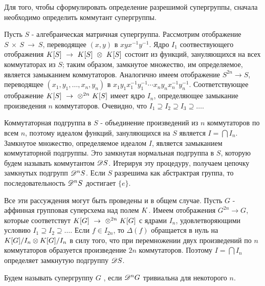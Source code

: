 Для того, чтобы сформулировать определение разрешимой супергруппы,
сначала необходимо определить коммутант супергруппы.

Пусть $ S $ - алгебраическая матричная супергруппа. Рассмотрим отображение
$ S ~\times ~S ~\to ~S $, переводящее $ (x, y) $ в $ xyx^{-1}y^{-1} $.
Ядро $ I_{1} $ соотвествующего отображения $ K[S] ~\to ~K[S] ~\otimes ~K[S] $ состоит из функций, зануляющихся на всех коммутаторах из $ S $;
таким образом, замкнутое множество, им определяемое, является замыканием коммутаторов. Аналогично имеем отображение $ S^{2n} \to S $, 
переводящее $ (x_1, y_1, \ldots, x_n, y_n) $ в 
$ x_1y_1x_1^{-1}y_1^{-1} \cdots x_ny_nx_n^{-1}y_n^{-1} $.
Соответствующее отображение $ K[S] ~\to ~\otimes^{2n} ~K[S] $ имеет ядро
$ I_n $, определяющее замыкание произведения $ n $ коммутаторов. 
Очевидно, что $ I_1 \supseteq I_2 \supseteq I_3 \supseteq \ldots $.

Коммутаторная подгруппа в $ S $ - объединение произведений из $ n $ 
коммутаторов по всем $ n $, поэтому идеалом функций, зануляющихся на $ S $ является $ I = \bigcap I_n $. Замкнутое множество, определяемое идеалом $ I $,
является замыканием коммутаторной подгруппы. Это замкнутая нормальная подгруппа в 
$ S $, которую будем называть коммутантом $ \mathscr{D} S $.
Итерируя эту процедуру, получаем цепочку замкнутых подгрупп $ \mathscr{D}^{n} S $. Если $ S $ разрешима как абстрактрая группа, 
то последовательность $ \mathscr{D}^{n} S $ достигает $ \{e\} $.


Все эти рассуждения могут быть проведены и в общем случае. Пусть $ G $ - аффинная групповая суперсхема над полем $ K $. Имеем отображения $ G^{2n} \to G $, которые соответствут $ K[G] ~\to ~\otimes^{2n} ~K[G] $ с ядрами $ I_n $, удовлетворяющими условию $ I_1 \supseteq I_2 \supseteq \ldots $. Если $ f \in I_{2n} $,
то $ \Delta(f) $ обращается в нуль на $ K[G] / I_n \otimes K[G] / I_n $ в силу того, что при перемножении двух произведений по $ n $ коммутаторов образуется произведение $ 2n $ коммутаторов. Поэтому $ I = \bigcap I_n $ определяет замкнутую подгруппу $ \mathscr{D} S $.


Будем называть супергруппу $ G $ , если $ \mathscr{D}^{n} G $ тривиальна для некоторого $ n $.



\proof {
\qedhere
}


